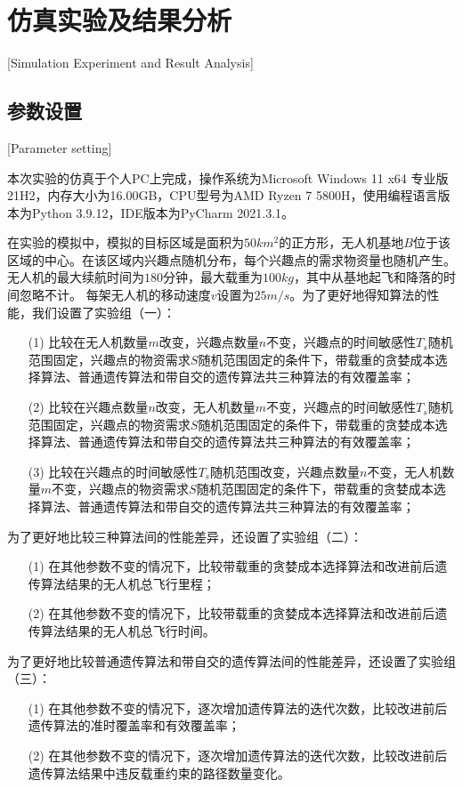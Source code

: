 
\chapter{仿真实验及结果分析}[Simulation Experiment and Result Analysis]

\section{参数设置}[Parameter setting]

本次实验的仿真于个人PC上完成，操作系统为Microsoft Windows 11 x64 专业版 21H2，内存大小为16.00GB，CPU型号为AMD Ryzen 7 5800H，使用编程语言版本为Python 3.9.12，IDE版本为PyCharm 2021.3.1。


在实验的模拟中，模拟的目标区域是面积为$50km^2$的正方形，无人机基地$B$位于该区域的中心。在该区域内兴趣点随机分布，每个兴趣点的需求物资量也随机产生。无人机的最大续航时间为$180$分钟，最大载重为$100kg$，其中从基地起飞和降落的时间忽略不计。
每架无人机的移动速度$v$设置为$25m/s$。为了更好地得知算法的性能，我们设置了实验组（一）：
\begin{itemize}
	\item [(1)] 比较在无人机数量$m$改变，兴趣点数量$n$不变，兴趣点的时间敏感性$T_s$随机范围固定，兴趣点的物资需求$S$随机范围固定的条件下，带载重的贪婪成本选择算法、普通遗传算法和带自交的遗传算法共三种算法的有效覆盖率；
    \item [(2)] 比较在兴趣点数量$n$改变，无人机数量$m$不变，兴趣点的时间敏感性$T_s$随机范围固定，兴趣点的物资需求$S$随机范围固定的条件下，带载重的贪婪成本选择算法、普通遗传算法和带自交的遗传算法共三种算法的有效覆盖率；
    \item [(3)] 比较在兴趣点的时间敏感性$T_s$随机范围改变，兴趣点数量$n$不变，无人机数量$m$不变，兴趣点的物资需求$S$随机范围固定的条件下，带载重的贪婪成本选择算法、普通遗传算法和带自交的遗传算法共三种算法的有效覆盖率；
\end{itemize}


为了更好地比较三种算法间的性能差异，还设置了实验组（二）：
\begin{itemize}
	\item [(1)] 在其他参数不变的情况下，比较带载重的贪婪成本选择算法和改进前后遗传算法结果的无人机总飞行里程；
    \item [(2)] 在其他参数不变的情况下，比较带载重的贪婪成本选择算法和改进前后遗传算法结果的无人机总飞行时间。
\end{itemize}


为了更好地比较普通遗传算法和带自交的遗传算法间的性能差异，还设置了实验组（三）：
\begin{itemize}
	\item [(1)] 在其他参数不变的情况下，逐次增加遗传算法的迭代次数，比较改进前后遗传算法的准时覆盖率和有效覆盖率；
 	\item [(2)] 在其他参数不变的情况下，逐次增加遗传算法的迭代次数，比较改进前后遗传算法结果中违反载重约束的路径数量变化。
\end{itemize}
